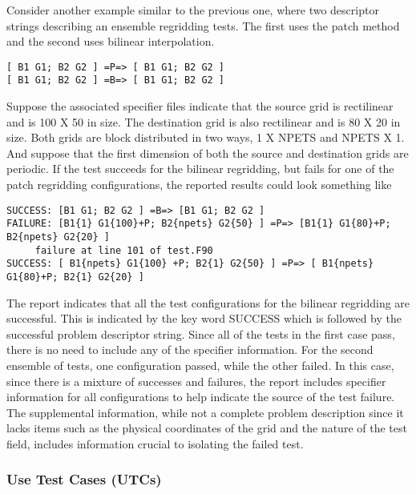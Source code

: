 Consider another example similar to the previous one, where two descriptor strings 
describing an ensemble regridding tests. The first uses the patch method and the 
second uses bilinear interpolation.

\begin{center}
\begin{verbatim}
[ B1 G1; B2 G2 ] =P=> [ B1 G1; B2 G2 ] 
[ B1 G1; B2 G2 ] =B=> [ B1 G1; B2 G2 ] 
\end{verbatim}
\end{center}

Suppose the associated specifier files indicate that the source  grid is rectilinear
and is 100 X 50 in size. The destination grid is also rectilinear and is 80 X 20 
in size. 
Both grids are block distributed in two 
ways, 1 X NPETS and NPETS X 1. And suppose that the first dimension of both the
source and destination grids are periodic. If the test succeeds for the bilinear
regridding, but fails for one of the patch regridding configurations, the reported results
could look something like

\begin{verbatim}
SUCCESS: [B1 G1; B2 G2 ] =B=> [B1 G1; B2 G2 ] 
FAILURE: [B1{1} G1{100}+P; B2{npets} G2{50} ] =P=> [B1{1} G1{80}+P; B2{npets} G2{20} ] 
     failure at line 101 of test.F90
SUCCESS: [ B1{npets} G1{100} +P; B2{1} G2{50} ] =P=> [ B1{npets} G1{80}+P; B2{1} G2{20} ] 
\end{verbatim}

The report indicates that all the test configurations for the bilinear regridding
are successful. This is indicated by the key word SUCCESS which is followed by the 
successful problem descriptor string. Since all of the tests in the first case pass,
there is no need to include any of the specifier information. For the second
ensemble of tests, one configuration passed, while the other failed. In this case,
since there is a mixture of successes and failures, the report includes 
specifier information for all configurations to help indicate the source of the
test failure. The supplemental information, while not a complete problem description
since it lacks items such as the physical coordinates of the grid and the nature of 
the test field, includes information crucial to isolating the failed test.


\subsubsection{Use Test Cases (UTCs)}

